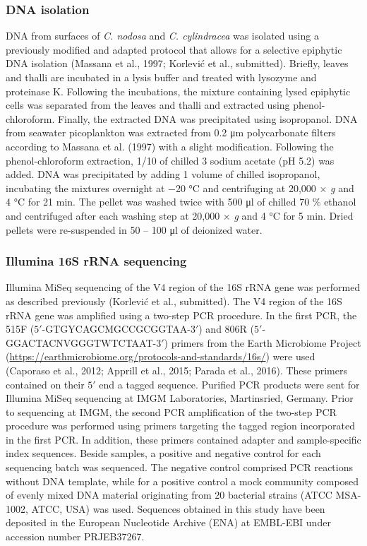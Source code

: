 \documentclass[12pt,]{article}
\begin{document}
\hypertarget{dna-isolation}{%
\subsubsection{DNA isolation}\label{dna-isolation}}

DNA from surfaces of \emph{C. nodosa} and \emph{C. cylindracea} was
isolated using a previously modified and adapted protocol that allows
for a selective epiphytic DNA isolation (Massana et al., 1997; Korlević
et al., submitted). Briefly, leaves and thalli are incubated in a lysis
buffer and treated with lysozyme and proteinase K. Following the
incubations, the mixture containing lysed epiphytic cells was separated
from the leaves and thalli and extracted using phenol-chloroform.
Finally, the extracted DNA was precipitated using isopropanol. DNA from
seawater picoplankton was extracted from 0.2 \si{\um} polycarbonate
filters according to Massana et al. (1997) with a slight modification.
Following the phenol-chloroform extraction, 1/10 of chilled 3
\si{\Molar} sodium acetate (pH 5.2) was added. DNA was precipitated by
adding 1 volume of chilled isopropanol, incubating the mixtures
overnight at \num{-20} \si{\degreeCelsius} and centrifuging at 20,000 ×
\emph{g} and 4 \si{\degreeCelsius} for 21 \si{\minute}. The pellet was
washed twice with 500 \si{\ul} of chilled 70 \si{\percent} ethanol and
centrifuged after each washing step at 20,000 × \emph{g} and 4
\si{\degreeCelsius} for 5 \si{\minute}. Dried pellets were re-suspended
in 50 -- 100 \si{\ul} of deionized water.

\hypertarget{illumina-16s-rrna-sequencing}{%
\subsubsection{Illumina 16S rRNA
sequencing}\label{illumina-16s-rrna-sequencing}}

Illumina MiSeq sequencing of the V4 region of the 16S rRNA gene was
performed as described previously (Korlević et al., submitted). The V4
region of the 16S rRNA gene was amplified using a two-step PCR
procedure. In the first PCR, the 515F
(\(5'\)-GTGYCAGCMGCCGCGGTAA-\(3'\)) and 806R
(\(5'\)-GGACTACNVGGGTWTCTAAT-\(3'\)) primers from the Earth Microbiome
Project (\url{https://earthmicrobiome.org/protocols-and-standards/16s/})
were used (Caporaso et al., 2012; Apprill et al., 2015; Parada et al.,
2016). These primers contained on their \(5'\) end a tagged sequence.
Purified PCR products were sent for Illumina MiSeq sequencing at IMGM
Laboratories, Martinsried, Germany. Prior to sequencing at IMGM, the
second PCR amplification of the two-step PCR procedure was performed
using primers targeting the tagged region incorporated in the first PCR.
In addition, these primers contained adapter and sample-specific index
sequences. Beside samples, a positive and negative control for each
sequencing batch was sequenced. The negative control comprised PCR
reactions without DNA template, while for a positive control a mock
community composed of evenly mixed DNA material originating from 20
bacterial strains (ATCC MSA-1002, ATCC, USA) was used. Sequences
obtained in this study have been deposited in the European Nucleotide
Archive (ENA) at EMBL-EBI under accession number PRJEB37267.
\end{document}

